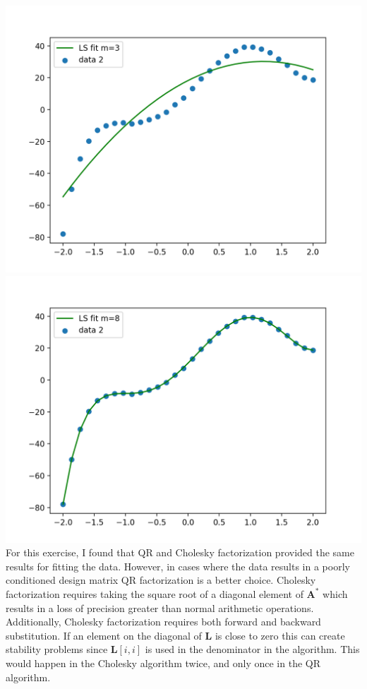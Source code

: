 \documentclass[11pt]{article}
\begin{document}
\begin{enumerate}
\includegraphics[scale=0.5]{data2_m3.png}
\includegraphics[scale=0.5]{data2_m8.png}\\
For this exercise, I found that QR and Cholesky factorization provided the same results for fitting the data. However, in cases where the data results in a poorly conditioned design matrix QR factorization is a better choice. Cholesky factorization requires taking the square root of a diagonal element of $\bm A^{*}$ which results in a loss of precision greater than normal arithmetic operations.  Additionally, Cholesky factorization requires both forward and backward substitution. If an element on the diagonal of $\bm L$ is close to zero this can create stability problems since $\bm L[i,i]$ is used in the denominator in the algorithm. This would happen in the Cholesky algorithm twice, and only once in the QR algorithm.
\end{enumerate}
\end{document}
